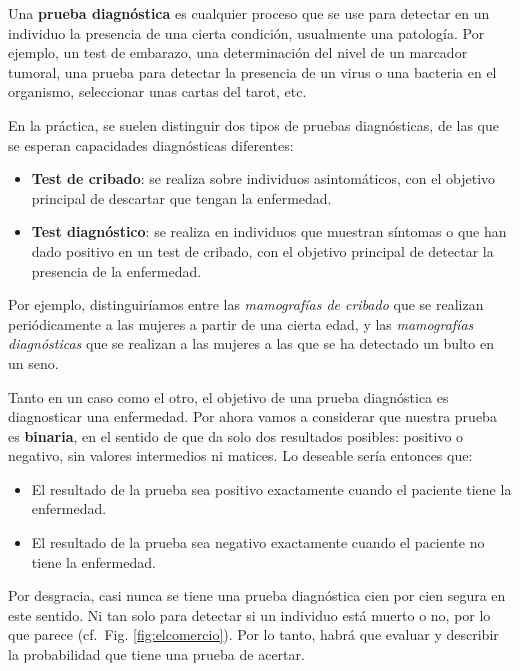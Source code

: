 \documentclass[
]{book}
\theoremstyle{definition}
\theoremstyle{definition}
\theoremstyle{definition}
\theoremstyle{definition}
\theoremstyle{remark}
\begin{document}
Una \textbf{prueba diagnóstica} es cualquier proceso que se use para detectar en un individuo la presencia de una cierta condición, usualmente una patología. Por ejemplo, un test de embarazo, una determinación del nivel de un marcador tumoral, una prueba para detectar la presencia de un virus o una bacteria en el organismo, seleccionar unas cartas del tarot, etc.

En la práctica, se suelen distinguir dos tipos de pruebas diagnósticas, de las que se esperan capacidades diagnósticas diferentes:

\begin{itemize}
\item
  \textbf{Test de cribado}: se realiza sobre individuos asintomáticos, con el objetivo principal de descartar que tengan la enfermedad.
\item
  \textbf{Test diagnóstico}: se realiza en individuos que muestran síntomas o que han dado positivo en un test de cribado, con el objetivo principal de detectar la presencia de la enfermedad.
\end{itemize}

Por ejemplo, distinguiríamos entre las \emph{mamografías de cribado} que se realizan periódicamente a las mujeres a partir de una cierta edad, y las \emph{mamografías diagnósticas} que se realizan a las mujeres a las que se ha detectado un bulto en un seno.

Tanto en un caso como el otro, el objetivo de una prueba diagnóstica es diagnosticar una enfermedad. Por ahora vamos a considerar que nuestra prueba es \textbf{binaria}, en el sentido de que da solo dos resultados posibles: positivo o negativo, sin valores intermedios ni matices. Lo deseable sería entonces que:

\begin{itemize}
\item
  El resultado de la prueba sea positivo exactamente cuando el paciente tiene la enfermedad.
\item
  El resultado de la prueba sea negativo exactamente cuando el paciente no tiene la enfermedad.
\end{itemize}

Por desgracia, casi nunca se tiene una prueba diagnóstica cien por cien segura en este sentido. Ni tan solo para detectar si un individuo está muerto o no, por lo que parece (cf.~Fig. \ref{fig:elcomercio}). Por lo tanto, habrá que evaluar y describir la probabilidad que tiene una prueba de acertar.
\end{document}
